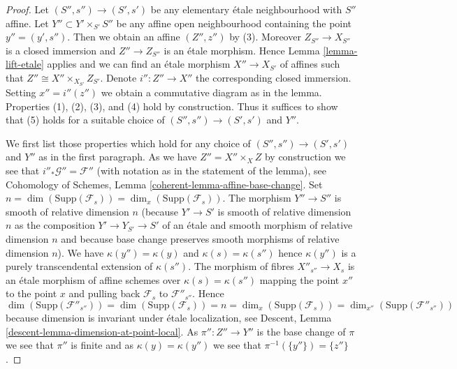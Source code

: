 \documentclass[10pt,a4paper]{amsart}
\theoremstyle{plain}
\theoremstyle{definition}
\theoremstyle{remark}
\numberwithin{equation}{subsection}
\begin{document}
\begin{proof}
Let $(S'', s'') \to (S', s')$ be any elementary \'etale neighbourhood
with $S''$ affine. Let $Y'' \subset Y' \times_{S'} S''$ be any affine
open neighbourhood containing the point $y'' = (y', s'')$. Then we
obtain an affine $(Z'', z'')$ by (3). Moreover $Z_{S''} \to X_{S''}$
is a closed immersion and $Z'' \to Z_{S''}$ is an \'etale
morphism. Hence
Lemma \ref{lemma-lift-etale}
applies and we can find an \'etale morphism $X'' \to X_{S'}$ of affines
such that $Z'' \cong X'' \times_{X_{S'}} Z_{S'}$. Denote $i'' : Z'' \to X''$
the corresponding closed immersion. Setting $x'' = i''(z'')$ we obtain a
commutative diagram as in the lemma.
Properties (1), (2), (3), and (4) hold by construction.
Thus it suffices to show that (5) holds for a suitable choice of
$(S'', s'') \to (S', s')$ and $Y''$.

\medskip\noindent
We first list those properties which hold for any choice of
$(S'', s'') \to (S', s')$ and $Y''$ as in the first paragraph.
As we have $Z'' = X'' \times_X Z$ by construction we see that
$i''_*\mathcal{G}'' = \mathcal{F}''$ (with notation as in the
statement of the lemma), see
Cohomology of Schemes, Lemma \ref{coherent-lemma-affine-base-change}.
Set $n = \dim(\text{Supp}(\mathcal{F}_s)) = \dim_x(\text{Supp}(\mathcal{F}_s))$.
The morphism $Y'' \to S''$ is smooth of relative dimension $n$
(because $Y' \to S'$ is smooth of relative dimension $n$
as the composition $Y' \to Y_{S'} \to S'$ of an \'etale and
smooth morphism of relative dimension $n$ and because base change
preserves smooth morphisms of relative dimension $n$).
We have $\kappa(y'') = \kappa(y)$ and $\kappa(s) = \kappa(s'')$
hence $\kappa(y'')$ is a purely transcendental extension of $\kappa(s'')$.
The morphism of fibres $X''_{s''} \to X_s$ is an \'etale morphism of affine
schemes over $\kappa(s) = \kappa(s'')$ mapping the point $x''$ to the
point $x$ and pulling back $\mathcal{F}_s$ to $\mathcal{F}''_{s''}$.
Hence
$$
\dim(\text{Supp}(\mathcal{F}''_{s''})) =
\dim(\text{Supp}(\mathcal{F}_s)) = n =
\dim_x(\text{Supp}(\mathcal{F}_s)) =
\dim_{x''}(\text{Supp}(\mathcal{F}''_{s''}))
$$
because dimension is invariant under \'etale localization, see
Descent, Lemma \ref{descent-lemma-dimension-at-point-local}.
As $\pi'' : Z'' \to Y''$ is the base change of $\pi$ we see that
$\pi''$ is finite and as $\kappa(y) = \kappa(y'')$ we see that
$\pi^{-1}(\{y''\}) = \{z''\}$.


\end{proof}
\end{document}
